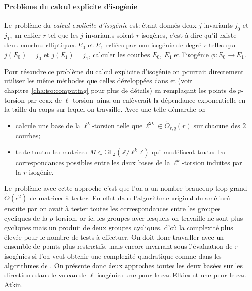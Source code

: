 \documentclass[10pt,a4paper]{book}
\theoremstyle{plain}
\theoremstyle{definition}
\theoremstyle{definition}
\theoremstyle{definition}
\theoremstyle{definition}
\theoremstyle{definition}
\theoremstyle{remark}
\theoremstyle{remark}
\theoremstyle{definition}
\begin{document}
\paragraph{Problème du calcul explicite d'isogénie} \label{prob:isogeny-problem}

Le problème du \emph{calcul explicite d'isogénie} est: étant donnés deux
$j$-invariants $j_0$ et $j_1$, un entier $r$ tel que les $j$-invariants soient 
$r$-isogènes, c'est à dire qu'il existe deux courbes elliptiques $E_0$ et $E_1$
reliées par une isogénie de degré $r$ telles que $j(E_0)=j_0$ et $j(E_1)=j_1$, 
calculer les courbes $E_0$, $E_1$ et l'isogénie $\phi:E_0 \rightarrow E_1$.

\smallskip

Pour résoudre ce problème du calcul explicite d'isogénie on pourrait 
directement utiliser 
les même méthodes que celles développées dans \cite{Couveignes96} et 
\cite{DeFeo11} (voir chapitre~\ref{cha:iso:computing} pour plus de détails) en 
remplaçant les points de $p$-torsion par ceux de $\ell$-torsion, ainsi on 
enlèverait la dépendance exponentielle en la taille du corps sur lequel on 
travaille. Avec une telle démarche on 
\begin{itemize}
\item calcule une base de la $\ell^k$-torsion telle que $\ell^{2k} \in \tilde 
{O}_{r,q}(r)$ sur chacune des $2$ courbes;
\item teste toutes les matrices $M \in \mathbb{GL}_2(\mathbb{Z}/\ell^k
\mathbb{Z})$ qui modélisent toutes les correspondances possibles entre les 
deux bases de la $\ell^k$-torsion induites par la $r$-isogénie.
\end{itemize}
Le problème avec cette approche c'est que l'on a un nombre beaucoup trop grand
$\tilde O(r^2)$ de matrices à tester. En effet dans l'algorithme original de 
\cite{Couveignes96} amélioré ensuite par \cite{DeFeo11} on avait à tester 
toutes les correspondances entre les groupes cycliques de la $p$-torsion, or 
ici les groupes avec lesquels on travaille ne sont plus cycliques mais un 
produit de deux groupes cycliques, d'où la complexité plus élevée pour le nombre 
de tests à effectuer. On doit donc travailler avec un ensemble de 
points plus restrictifs, mais encore invariant sous l'évaluation de $r$-isogénies 
si l'on veut obtenir une complexité quadratique comme dans
les algorithmes de \cite{DeFeo11}. On présente donc deux approches toutes les 
deux basées sur les directions dans le volcan de $\ell$-isogénies une pour le 
cas Elkies et une pour le cas Atkin.
\end{document}
